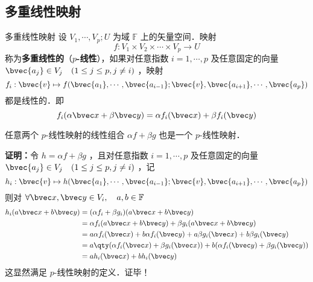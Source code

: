 \subsection{多重线性映射}
\begin{definition}{多重线性映射}
设 $V_1,\cdots,V_p;U$ 为域 $\mathbb{F}$ 上的矢量空间．映射
\begin{equation}
f:V_1\times V_2\times\cdots\times V_p\rightarrow U
\end{equation}
称为\textbf{多重线性的}（\textbf{$p$-线性}），如果对任意指数 $i=1,\cdots,p$ 及任意固定的向量 $\bvec{a_j}\in V_j\quad(1\leq j\leq p,j\neq i)$ ，映射
\begin{equation}
f_i:\bvec{v}\mapsto f(\bvec{a_1},\cdots,\bvec{a_{i-1}};\bvec{v},\bvec{a_{i+1}},\cdots,\bvec{a_p})
\end{equation}
都是线性的．即
\begin{equation}
f_i(\alpha\bvec x+\beta\bvec y)=\alpha f_i(\bvec x)+\beta f_i(\bvec y)
\end{equation}
\end{definition}
\begin{theorem}{}\label{MulMap_the1}
任意两个 $p$-线性映射的线性组合 $\alpha f+\beta g$ 也是一个 $p$-线性映射．
\end{theorem}
\textbf{证明：}令 $h=\alpha f+\beta g$ ，且对任意指数 $i=1,\cdots,p$ 及任意固定的向量 $\bvec{a_j}\in V_j\quad(1\leq j\leq p,j\neq i)$ ，记
\begin{equation}
h_i:\bvec{v}\mapsto h(\bvec{a_1},\cdots,\bvec{a_{i-1}};\bvec{v},\bvec{a_{i+1}},\cdots,\bvec{a_p})
\end{equation}
则对 $\forall \bvec x,\bvec y\in V_i,\quad a,b\in\mathbb{F}$
\begin{equation}
\begin{aligned}
h_i(a \bvec x+b\bvec y)&=(\alpha f_i+\beta g_i)(a \bvec x+b\bvec y)\\
&=\alpha f_i(a \bvec x+b\bvec y)+\beta g_i(a \bvec x+b\bvec y)\\
&=a\alpha f_i(\bvec x)+b\alpha f_i(\bvec y)+a\beta g_i(\bvec x)+b\beta g_i(\bvec y)\\
&=a\qty(\alpha f_i(\bvec x)+\beta g_i(\bvec x))+b(\alpha f_i(\bvec y)+\beta g_i(\bvec y))\\
&=ah_i(\bvec x)+bh_i(\bvec y)
\end{aligned}
\end{equation}
这显然满足 $p$-线性映射的定义．证毕！

